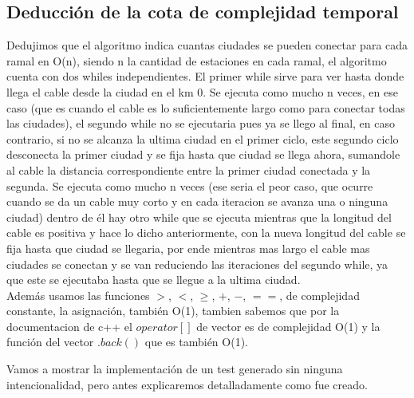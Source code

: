 \subsection{Deducción de la cota de complejidad temporal}


Dedujimos que el algoritmo indica cuantas ciudades se pueden conectar para cada ramal en O(n), siendo n la cantidad de estaciones en cada ramal, el algoritmo cuenta con dos whiles independientes. El primer while sirve para ver hasta donde llega el cable desde la ciudad en el km 0. Se ejecuta como mucho n veces, en ese caso (que es cuando el cable es lo suficientemente largo como para conectar todas las ciudades), el segundo while no se ejecutaria pues ya se llego al final, en caso contrario, si no se alcanza la ultima ciudad en el primer ciclo, este segundo ciclo desconecta la primer ciudad y se fija hasta que ciudad se llega ahora, sumandole al cable la distancia correspondiente entre la primer ciudad conectada y la segunda. Se ejecuta como mucho n veces (ese seria el peor caso, que ocurre cuando se da un cable muy corto y en cada iteracion se avanza una o ninguna ciudad) dentro de él hay otro while que se ejecuta mientras que la longitud del cable es positiva y hace lo dicho anteriormente, con la nueva longitud del cable se fija hasta que ciudad se llegaria, por ende mientras mas largo el cable mas ciudades se conectan y se van reduciendo las iteraciones del segundo while, ya que este se ejecutaba hasta que se llegue a la ultima ciudad.\\
Además usamos las funciones $>$, $<$, $\geq$, $+$, $-$, $==$,  de complejidad constante, la asignación, también O(1), tambien sabemos que por la documentacion de c++ el $operator[]$ de vector es de complejidad O(1) y la función del vector $.back()$ que es también O(1).

Vamos a mostrar la implementación de un test generado sin ninguna intencionalidad, pero antes explicaremos detalladamente como fue creado. \\

